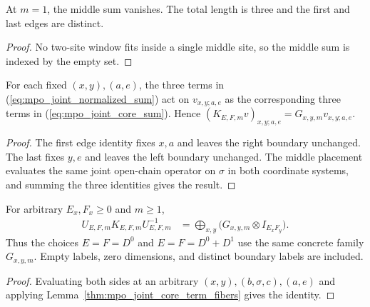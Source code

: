\begin{lemma}
    \label{thm:mpo_joint_three_site_middle}
    \leanok
    At $m=1$, the middle sum vanishes. The total length is three and
    the first and last edges are distinct.
\end{lemma}
\begin{proof}
    \leanok
    No two-site window fits inside a single middle site, so the middle
    sum is indexed by the empty set.
\end{proof}

\begin{lemma}
    \label{thm:mpo_joint_core_term_fibers}
    \leanok
    For each fixed $(x,y),(a,e)$, the three terms in
    (\ref{eq:mpo_joint_normalized_sum}) act on $v_{x,y;a,e}$ as the
    corresponding three terms in (\ref{eq:mpo_joint_core_sum}). Hence
    $(K_{E,F,m}v)_{x,y;a,e}=G_{x,y,m}v_{x,y;a,e}$.
\end{lemma}
\begin{proof}
    \leanok
    The first edge identity fixes $x,a$ and leaves the right boundary
    unchanged. The last fixes $y,e$ and leaves the left boundary unchanged.
    The middle placement evaluates the same joint open-chain operator on
    $\sigma$ in both coordinate systems, and summing the three identities
    gives the result.
\end{proof}

\begin{lemma}
    \label{thm:mpo_joint_core_operator_identity}
    \leanok
    For arbitrary $E_x,F_x\geq0$ and $m\geq1$,
    \begin{align}
        U_{E,F,m}K_{E,F,m}U_{E,F,m}^{-1}
         & =\bigoplus_{x,y}\bigl(G_{x,y,m}\otimes I_{E_xF_y}\bigr).
        \label{eq:mpo_joint_core_identity}
    \end{align}
    Thus the choices $E=F=D^0$ and $E=F=D^0+D^1$ use the same concrete
    family $G_{x,y,m}$. Empty labels, zero dimensions, and distinct
    boundary labels are included.
\end{lemma}
\begin{proof}
    \leanok
    Evaluating both sides at an arbitrary $(x,y),(b,\sigma,c),(a,e)$ and
    applying Lemma~\ref{thm:mpo_joint_core_term_fibers} gives the
    identity.
\end{proof}

